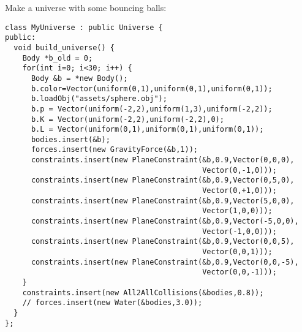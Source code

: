 \noindent
Make a universe with some bouncing balls: \begin{lstlisting}
class MyUniverse : public Universe {
public:
  void build_universe() {
    Body *b_old = 0;
    for(int i=0; i<30; i++) {
      Body &b = *new Body();
      b.color=Vector(uniform(0,1),uniform(0,1),uniform(0,1));
      b.loadObj("assets/sphere.obj");
      b.p = Vector(uniform(-2,2),uniform(1,3),uniform(-2,2));
      b.K = Vector(uniform(-2,2),uniform(-2,2),0);
      b.L = Vector(uniform(0,1),uniform(0,1),uniform(0,1));
      bodies.insert(&b);
      forces.insert(new GravityForce(&b,1));
      constraints.insert(new PlaneConstraint(&b,0.9,Vector(0,0,0),
                                             Vector(0,-1,0)));
      constraints.insert(new PlaneConstraint(&b,0.9,Vector(0,5,0),
                                             Vector(0,+1,0)));
      constraints.insert(new PlaneConstraint(&b,0.9,Vector(5,0,0),
                                             Vector(1,0,0)));
      constraints.insert(new PlaneConstraint(&b,0.9,Vector(-5,0,0),
                                             Vector(-1,0,0)));
      constraints.insert(new PlaneConstraint(&b,0.9,Vector(0,0,5),
                                             Vector(0,0,1)));
      constraints.insert(new PlaneConstraint(&b,0.9,Vector(0,0,-5),
                                             Vector(0,0,-1)));
    }
    constraints.insert(new All2AllCollisions(&bodies,0.8));
    // forces.insert(new Water(&bodies,3.0));
  }
};
\end{lstlisting}
\noindent
